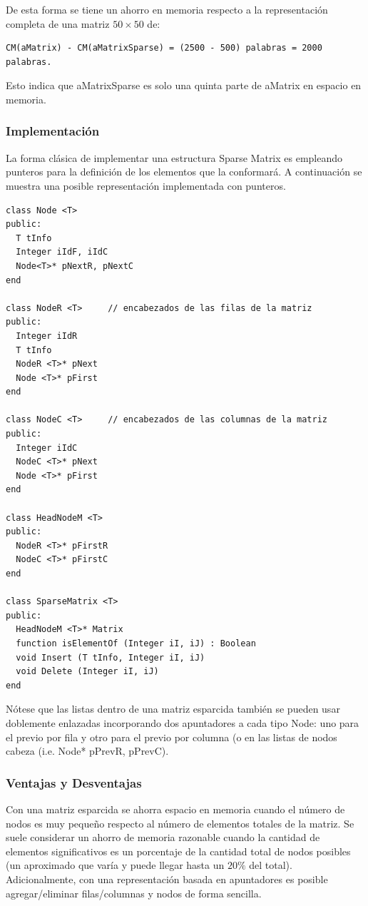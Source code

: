 De esta forma se tiene un ahorro en memoria respecto a la representación completa de una matriz $50 \times 50$ de: 
\begin{lstlisting}[upquote=true, language=pseudo]
CM(aMatrix) - CM(aMatrixSparse) = (2500 - 500) palabras = 2000 palabras. 
\end{lstlisting}

Esto indica que aMatrixSparse es solo una quinta parte de aMatrix en espacio en memoria.

\subsubsection{Implementación}

La forma clásica de implementar una estructura Sparse Matrix es empleando punteros para la definición de los elementos que la conformará. A continuación se muestra una posible representación implementada con punteros.

\begin{lstlisting}[upquote=true, language=pseudo]
class Node <T>
public:
  T tInfo
  Integer iIdF, iIdC
  Node<T>* pNextR, pNextC
end

class NodeR <T>		// encabezados de las filas de la matriz
public:
  Integer iIdR
  T	tInfo
  NodeR <T>* pNext
  Node <T>* pFirst
end

class NodeC <T>		// encabezados de las columnas de la matriz
public:
  Integer iIdC
  NodeC <T>* pNext
  Node <T>* pFirst
end

class HeadNodeM <T>
public:
  NodeR <T>* pFirstR
  NodeC <T>* pFirstC
end

class SparseMatrix <T>
public:
  HeadNodeM <T>* Matrix
  function isElementOf (Integer iI, iJ) : Boolean
  void Insert (T tInfo, Integer iI, iJ)
  void Delete (Integer iI, iJ)
end
\end{lstlisting}

Nótese que las listas dentro de una matriz esparcida también se pueden usar doblemente enlazadas incorporando dos apuntadores a cada tipo Node: uno para el previo por fila y otro para el previo por columna (o en las listas de nodos cabeza (i.e. Node* pPrevR, pPrevC).


\subsubsection{Ventajas y Desventajas}

Con una matriz esparcida se ahorra espacio en memoria cuando el número de nodos es muy pequeño respecto al número de elementos totales de la matriz. Se suele considerar un ahorro de memoria razonable cuando la cantidad de elementos significativos es un porcentaje de la cantidad total de nodos posibles (un aproximado que varía y puede llegar hasta un $20\%$ del total). Adicionalmente, con una representación basada en apuntadores es posible agregar/eliminar filas/columnas y nodos de forma sencilla.

